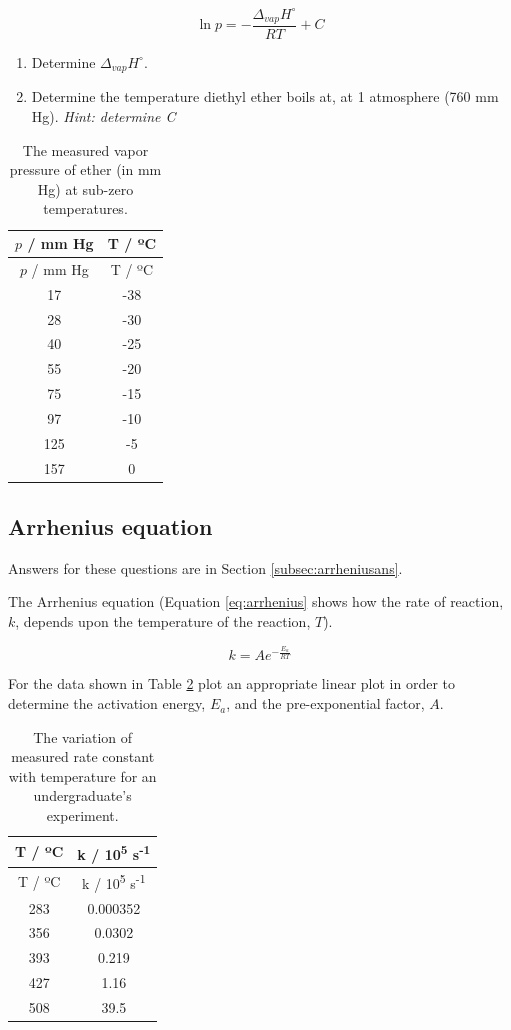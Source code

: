 \documentclass[
]{book}
\providecommand{\tightlist}{%
  \setlength{\itemsep}{0pt}\setlength{\parskip}{0pt}}
\begin{document}
\begin{equation}
\ln p = -\frac{\Delta_{vap}H^\circ}{RT}+C
\label{eq:clausius}
\end{equation}

\begin{enumerate}
\def\labelenumi{\arabic{enumi}.}
\tightlist
\item
  Determine \(\Delta _{vap}H^\circ\).
\item
  Determine the temperature diethyl ether boils at, at 1 atmosphere (760 mm Hg). \emph{Hint: determine C}
\end{enumerate}

\begin{longtable}[]{@{}cc@{}}
\caption{\label{tab:ether} The measured vapor pressure of ether (in mm Hg) at sub-zero temperatures.}\tabularnewline
\toprule
\(p\) / mm Hg & T / ºC\tabularnewline
\midrule
\endfirsthead
\toprule
\(p\) / mm Hg & T / ºC\tabularnewline
\midrule
\endhead
17 & -38\tabularnewline
28 & -30\tabularnewline
40 & -25\tabularnewline
55 & -20\tabularnewline
75 & -15\tabularnewline
97 & -10\tabularnewline
125 & -5\tabularnewline
157 & 0\tabularnewline
\bottomrule
\end{longtable}

\hypertarget{subsec:arrhenius}{%
\subsection{Arrhenius equation}\label{subsec:arrhenius}}

Answers for these questions are in Section \ref{subsec:arrheniusans}.

The Arrhenius equation (Equation \eqref{eq:arrhenius} shows how the rate of reaction, \(k\), depends upon the temperature of the reaction, \(T\)).

\begin{equation}
k=Ae^{-\frac{E_a}{RT}}
\label{eq:arrhenius}
\end{equation}

For the data shown in Table \ref{tab:arrhenius} plot an appropriate linear plot in order to determine the activation energy, \(E_a\), and the pre-exponential factor, \(A\).

\begin{longtable}[]{@{}cc@{}}
\caption{\label{tab:arrhenius} The variation of measured rate constant with temperature for an undergraduate's experiment.}\tabularnewline
\toprule
T / ºC & k / 10\textsuperscript{5} s\textsuperscript{-1}\tabularnewline
\midrule
\endfirsthead
\toprule
T / ºC & k / 10\textsuperscript{5} s\textsuperscript{-1}\tabularnewline
\midrule
\endhead
283 & 0.000352\tabularnewline
356 & 0.0302\tabularnewline
393 & 0.219\tabularnewline
427 & 1.16\tabularnewline
508 & 39.5\tabularnewline
\bottomrule
\end{longtable}
\end{document}

